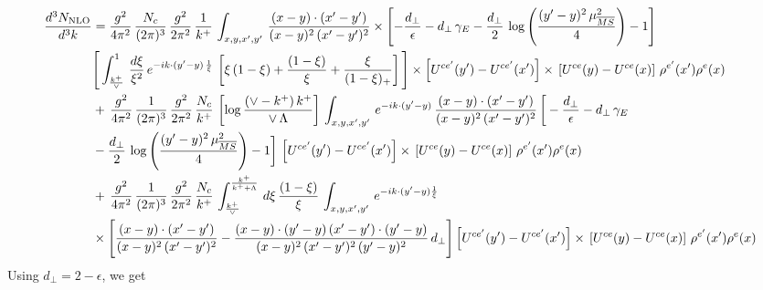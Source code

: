 \documentclass[9pt]{article}
\numberwithin{equation}{section}
\begin{document}
\begin{align}
    \frac{d^{3}N_{\rm NLO}}{d^{3}k}  & = \frac{g^{2}}{4\pi^{2}}\, \frac{N_{c}}{(2\pi)^{3}}\,\frac{g^{2}}{2\pi^{2}}\, \frac{1}{k^{+}}\,\int_{x,y,x',y'}\,\frac{(x-y)\cdot (x'-y')}{(x-y)^{2}\,(x'-y')^{2}}\times\left[-\frac{d_{\perp}}{\epsilon}-d_{\perp}\,\gamma_{E}-\frac{d_{\perp}}{2}\,\log{\left(\frac{(y'-y)^{2}\,\mu^{2}_{\overline{MS}}}{4}\right)}-1\right]\,\notag \\ & \Bigg[\int_{\frac{k^{+}}{\vee}}^{1}\,\frac{d\xi}{\xi^{2}}\,e^{-ik\cdot (y'-y)\,\frac{1}{\xi}}\,\left[\xi\,(1-\xi)+\frac{(1-\xi)}{\xi}+\frac{\xi}{(1-\xi)_{+}}\right]\Bigg]\times \left[U^{ce'}(y') - U^{ce'}(x')\right] \times\, \left[U^{ce}(y) - U^{ce}(x)\right]\, \rho^{e'}(x') \rho^{e}(x)\notag \\ &  +\, \frac{g^{2}}{4\pi^{2}}\, \frac{1}{(2\pi)^{3}}\,\frac{g^{2}}{2\pi^{2}}\, \frac{N_{c}}{k^{+}}\,\left[\log{\frac{(\vee - k^{+})\, k^{+}}{\vee\,\Lambda}}\right]\,\int_{x,y,x',y'}\,e^{-ik\cdot (y'-y)}\,\frac{(x-y)\cdot (x'-y')}{(x-y)^{2}\,(x'-y')^{2}}\,\bigg[-\frac{d_{\perp}}{\epsilon}-d_{\perp}\,\gamma_{E}\notag \\ & -\frac{d_{\perp}}{2}\,\log{\left(\frac{(y'-y)^{2}\,\mu^{2}_{\overline{MS}}}{4}\right)}-1\bigg]\,\left[U^{ce'}(y') - U^{ce'}(x')\right] \times\, \left[U^{ce}(y) - U^{ce}(x)\right]\, \rho^{e'}(x') \rho^{e}(x)\notag \\ & +\,\frac{g^{2}}{4\pi^{2}}\, \frac{1}{(2\pi)^{3}}\,\frac{g^{2}}{2\pi^{2}}\, \frac{N_{c}}{k^{+}}\,\int_{\frac{k^{+}}{\vee}}^{\frac{k^{+}}{k^{+}+\Lambda}}\,d\xi\, \frac{(1-\xi)}{\xi}\, \int_{x,y,x',y'}\,e^{-ik\cdot (y'-y)\frac{1}{\xi}}\notag\\&\times\Bigg[\frac{(x-y)\cdot (x'-y')}{(x-y)^{2}\, (x'-y')^{2}} -\frac{(x-y)\cdot (y'-y)\, (x'-y')\cdot (y'-y)}{(x-y)^{2}\,(x'-y')^{2}\,(y'-y)^{2}}\,d_{\perp}\Bigg]\left[U^{ce'}(y') - U^{ce'}(x')\right] \times\, \left[U^{ce}(y) - U^{ce}(x)\right]\, \rho^{e'}(x') \rho^{e}(x)\label{eq:R4start}
\end{align}
Using $d_{\perp} = 2-\epsilon$, we get
\end{document}
